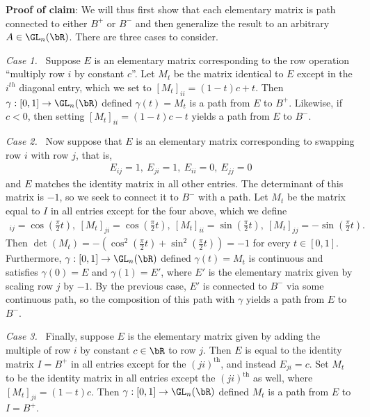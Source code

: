 \begin{homework}[e]
\begin{prf}
  \textbf{Proof of claim}: We will thus first show that each elementary matrix is path connected to either $B^+$ or $B^-$ and then generalize the result to an arbitrary $A \in \GL_n(\bR)$. There are three cases to consider.

  \emph{Case 1.}~ Suppose $E$ is an elementary matrix corresponding to the row operation ``multiply row $i$ by constant $c$''. Let $M_t$ be the matrix identical to $E$ except in the $i^{th}$ diagonal entry, which we set to $[M_t]_{ii} = (1 - t)c + t$. Then $\gamma:[0,1]\to \GL_n(\bR)$ defined $\gamma(t) = M_t$ is a path from $E$ to $B^+$. Likewise, if $c < 0$, then setting $[M_t]_{ii} = (1 - t)c - t$ yields a path from $E$ to $B^-$.

  \bigskip

  \emph{Case 2.}~ Now suppose that $E$ is an elementary matrix corresponding to swapping row $i$ with row $j$, that is,
  \begin{align*}
    E_{ij} = 1, ~ E_{ji} = 1, ~ E_{ii} = 0, ~ E_{jj} = 0
  \end{align*}
  and $E$ matches the identity matrix in all other entries. The determinant of this matrix is $-1$, so we seek to connect it to $B^-$ with a path. Let $M_t$ be the matrix equal to $I$ in all entries except for the four above, which we define
  \begin{align*}
    [M_t]_{ij} = \cos\left(\frac{\pi}{2}t\right), ~ [M_t]_{ji} = \cos\left(\frac{\pi}{2}t\right), ~[M_t]_{ii} = \sin \left(\frac{\pi}{2}t\right), ~[M_t]_{jj} = -\sin \left(\frac{\pi}{2}t\right).
  \end{align*}
  Then $\det(M_t) = -\left(\cos^2\left(\frac{\pi}{2}t\right) + \sin^2\left(\frac{\pi}{2}t\right)\right) = -1$ for every $t \in [0,1]$. Furthermore, $\gamma:[0,1] \to \GL_n(\bR)$ defined $\gamma(t) = M_t$ is continuous and satisfies $\gamma(0) = E$ and $\gamma(1) = E'$, where $E'$ is the elementary matrix given by scaling row $j$ by $-1$. By the previous case, $E'$ is connected to $B^-$ via some continuous path, so the composition of this path with $\gamma$ yields a path from $E$ to $B^-$.

  \bigskip

  \emph{Case 3.}~ Finally, suppose $E$ is the elementary matrix given by adding the multiple of row $i$ by constant $c \in \bR$ to row $j$. Then $E$ is equal to the identity matrix $I = B^+$ in all entries except for the $(ji)^{\text{th}}$, and instead $E_{ji} = c$. Set $M_t$ to be the identity matrix in all entries except the $(ji)^{\text{th}}$ as well, where $[M_t]_{ji} = (1- t)c$. Then $\gamma:[0,1]\to \GL_n(\bR)$ defined $M_t$ is a path from $E$ to $I = B^+$.


\end{prf}
\end{homework}
